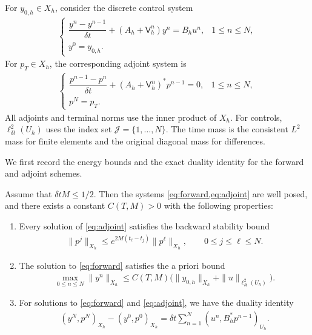 \documentclass[print,wide,eng]{draft}
\begin{document}
For $y_{0,h}\in X_h$, consider the discrete control system
%
\begin{align}\label{eq:forward}
\begin{cases}
\dfrac{y^n-y^{n-1}}{\delta t}+(A_h+\mathsf V_h^n)y^n=B_hu^n,
&1\leq n\leq N,\\
y^0=y_{0,h}.
\end{cases}
\end{align}
%
For $p_T\in X_h$, the corresponding adjoint system is
%
\begin{align}\label{eq:adjoint}
\begin{cases}
\dfrac{p^{n-1}-p^n}{\delta t}+(A_h+\mathsf V_h^n)^*p^{n-1}=0,
&1\leq n\leq N,\\
p^N=p_T.
\end{cases}
\end{align}
%
All adjoints and terminal norms use the inner product of $X_h$. For controls, $\ell_{\delta t}^2(U_h)$ uses the index set $\mathcal J=\{1,\ldots,N\}$. The time mass is the consistent $L^2$ mass for finite elements and the original diagonal mass for differences.

We first record the energy bounds and the exact duality identity for the forward and adjoint schemes.
%
\begin{lemma}\label{lem:physicalduality}
Assume that $\delta t M\le1/2$. Then the systems \cref{eq:forward,eq:adjoint} are well posed, and there exists a constant $C(T,M)>0$ with the following properties:
%
\begin{enumerate}
\item Every solution of \cref{eq:adjoint} satisfies the backward stability bound
%
\begin{align}\label{eq:adjointenergy}
\|p^j\|_{X_h}\le e^{2M(t_\ell-t_j)}\|p^\ell\|_{X_h},
\qquad0\le j\le\ell\le N.
\end{align}
%
\item The solution  to \eqref{eq:forward}  satisfies the a priori bound
%
\begin{align}\label{eq:forward-energy-bound}
\max_{0\le n\le N}\|y^n\|_{X_h}
\le C(T,M)\bigl(\|y_{0,h}\|_{X_h}+\|u\|_{\ell_{\delta t}^2(U_h)}\bigr).
\end{align}
%
\item For solutions to \eqref{eq:forward} and \eqref{eq:adjoint}, we have  the duality identity
%
\begin{align}\label{eq:trueD}
(y^N,p^N)_{X_h}-(y^0,p^0)_{X_h}
={\delta t}\sum_{n=1}^N(u^n,B_h^*p^{n-1})_{U_h}.
\end{align}
%
\end{enumerate}
%
\end{lemma}
%
\end{document}
